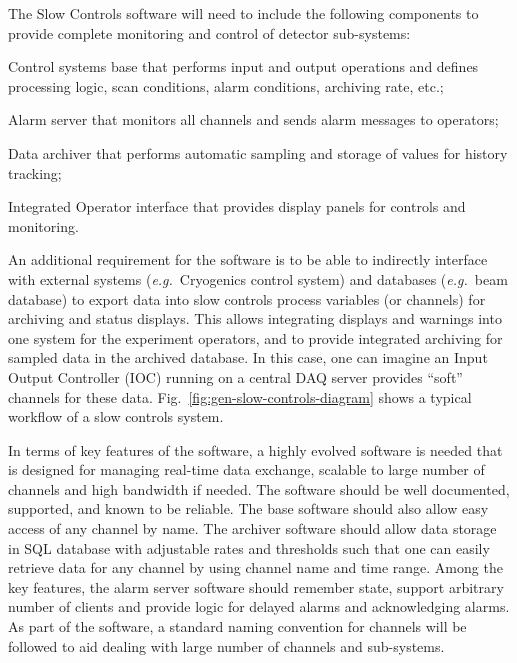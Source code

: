 
The Slow Controls software will need to include the following components
to provide complete monitoring and control of detector sub-systems:
%
\begin{description}
 \item{Control systems base} that performs input and output operations
  and defines processing logic, scan conditions, alarm conditions,
  archiving rate, etc.;
 \item{Alarm server} that monitors all channels and sends alarm
  messages to operators; 
 \item{Data archiver} that performs automatic sampling and storage of
  values for history tracking;
 \item{Integrated Operator interface} that provides display panels for
  controls and monitoring.
\end{description}

An additional requirement for the software is to be able to indirectly
interface with external systems ({\em e.g.}\ Cryogenics control
system) and databases ({\em e.g.}\ beam database) to export data into
slow controls process variables (or channels) for archiving and status
displays. This allows integrating displays and warnings into one
system for the experiment operators, and to provide integrated
archiving for sampled data in the archived database. In this case, one
can imagine an Input Output Controller (IOC) running on a central DAQ
server provides ``soft'' channels for these data.
Fig.\ \ref{fig:gen-slow-controls-diagram} shows a typical workflow of a
slow controls system.

In terms of key features of the software, a highly evolved software is
needed that is designed for managing real-time data exchange, scalable
to large number of channels and high bandwidth if needed. The software
should be well documented, supported, and known to be reliable. The base
software should also allow easy access of any channel by name. The
archiver software should allow data storage in SQL database with
adjustable rates and thresholds such that one can easily retrieve data
for any channel by using channel name and time range. Among the key
features, the alarm server software should remember state, support
arbitrary number of clients and provide logic for delayed alarms and
acknowledging alarms. As part of the software, a standard naming
convention for channels will be followed to aid dealing with large
number of channels and sub-systems.



